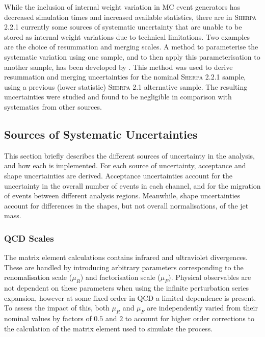 While the inclusion of internal weight variation in MC event generators has decreased simulation times and increased available statistics, there are in \textsc{Sherpa 2.2.1} currently some sources of systematic uncertainty that are unable to be stored as internal weight variations due to technical limitations.
Two examples are the choice of resummation and merging scales.
A method to parameterise the systematic variation using one sample, and to then apply this parameterisation to another sample, has been developed by \ATLAS \cite{Anders:2125718}.
This method was used to derive resummation and merging uncertainties for the nominal \textsc{Sherpa 2.2.1} sample, using a previous (lower statistic) \textsc{Sherpa 2.1} alternative sample.
The resulting uncertainties were studied and found to be negligible in comparison with systematics from other sources.



\subsection{Sources of Systematic Uncertainties}\label{sec:sources_of_uncertainties}

This section briefly describes the different sources of uncertainty in the analysis, and how each is implemented.
For each source of uncertainty, acceptance and shape uncertainties are derived.
Acceptance uncertainties account for the uncertainty in the overall number of events in each channel, and for the migration of events between different analysis regions.
Meanwhile, shape uncertainties account for differences in the shapes, but not overall normalisations, of the \largeR jet mass.

\subsubsection{QCD Scales}

The \Vjets matrix element calculations contains infrared and ultraviolet divergences.
These are handled by introducing arbitrary parameters corresponding to the renomalisation scale ($\mu_R$) and factorisation scale ($\mu_F$).
Physical observables are not dependent on these parameters when using the infinite perturbation series expansion, however at some fixed order in QCD a limited dependence is present.
To assess the impact of this, both $\mu_R$ and $\mu_F$ are independently varied from their nominal values by factors of $0.5$ and $2$ to account for higher order corrections to the calculation of the matrix element used to simulate the process.

